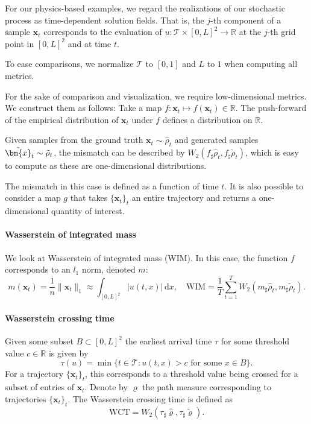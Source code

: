 \documentclass{article}
\theoremstyle{plain}
\theoremstyle{definition}
\theoremstyle{remark}
\newcommand{\R}{{\mathbb R}}
\newcommand{\x}{\bm{x}}
\newcommand{\bR}{\mathbb{R}}
\newcommand{\rd}{\mathrm{d}}
\begin{document}
For our physics-based examples, we regard the realizations of our stochastic process as time-dependent solution fields. That is, the $j$-th component of a sample $\x_t$ corresponds to the evaluation of $u : \mathcal{T} \times [0, L]^2 \to \mathbb{R}$ at the $j$-th grid point in $[0, L]^2$ and at time $t$.

To ease comparisons, we normalize $\mathcal T$ to $[0,1]$ and $L$ to $1$ when computing all metrics.

For the sake of comparison and visualization, we require low-dimensional metrics. We construct them as follows: Take a map $f: \x_t \mapsto f(\x_t) \in \bR$. The push-forward of the empirical distribution of $\x_t$ under $f$ defines a distribution on $\bR$.

Given samples from the ground truth $\x_t \sim \hat \rho_t$ and generated samples $\tilde \x_t \sim \tilde \rho_t$, the mismatch can be described by $W_2(f_\sharp \hat \rho_t, f_\sharp \tilde \rho_t)$, which is easy to compute as these are one-dimensional distributions.

The mismatch in this case is defined as a function of time $t$. It is also possible to consider a map $g$ that takes $\{\x_t \}_t$ an entire trajectory and returns a one-dimensional quantity of interest.

\paragraph{Wasserstein of integrated mass}

We look at  Wasserstein of integrated mass (WIM). In this case, the function $f$ corresponds to an $l_1$ norm, denoted $m$:
\[
  m(\x_t) = \frac{1}{n} \| \x_t \|_1 \approx \int_{[0,L]^2} | u(t, x) |\, \rd x, \quad \text{WIM} = \frac{1}{T} \sum_{t=1}^T W_2(m_\sharp \hat \rho_t, m_\sharp \tilde \rho_t).
\]
\paragraph{Wasserstein crossing time}
Given some subset $B \subset [0, L]^2$ the earliest arrival time $\tau$ for some threshold value $c \in \R$ is given by
\[
  \tau(u) = \min\{ t \in \mathcal{T} : u(t, x) > c \text{ for some } x \in B \}.
\]
For a trajectory $\{ \x_t \}_t$, this corresponds to a threshold value being crossed for a subset of entries of $\x_t$. Denote by $\varrho$ the path measure corresponding to trajectories $\{\x_t\}_t$. The Wasserstein crossing time is defined as
\[
  \text{WCT} = W_2(\tau_\sharp \hat \varrho, \tau_\sharp \tilde \varrho).
\]
\end{document}
